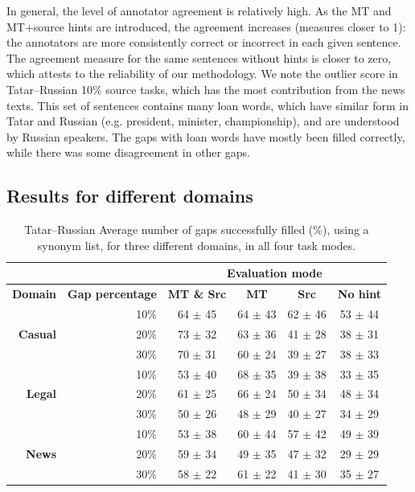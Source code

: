 \documentclass[11pt]{article}
\newcommand{\comment}[1]{}
\begin{document}
In general, the level of annotator agreement is relatively high. As the MT and MT+source hints are introduced, the agreement increases (measures closer to 1): the annotators are more consistently correct or incorrect in each given sentence. The agreement measure for the same sentences without hints is closer to zero, which attests to the reliability of our methodology. We note the outlier score in Tatar--Russian 10\% source tasks, which has the most contribution from the news texts. \comment{EA: this Alpha is from a table we do not report here, I added a couple of words to clarify}This set of sentences contains many loan words, which have similar form in Tatar and Russian (e.g. president, minister, championship), and are understood by Russian speakers. The gaps with loan words have mostly been filled correctly, while there was some disagreement in other gaps.

\subsection{Results for different domains}
\begin{table}
\centering
\begin{tabular}{|r|r |*{4}{c}|}
\hline
\multicolumn{2}{|c|}{} &\multicolumn{4}{c|}{\textbf{Evaluation mode}}\\
\hline
\textbf{Domain} & \textbf{Gap percentage} & \textbf{MT \& Src} & \textbf{MT} & \textbf{Src} & \textbf{No hint} \\
\hline
 \multirow{3}{*}{\textbf{Casual}} &
10\%&64 \(\pm\) 45&64 \(\pm\) 43&62 \(\pm\) 46&53 \(\pm\) 44\\
& 20\%&73 \(\pm\) 32&63 \(\pm\) 36&41 \(\pm\) 28&38 \(\pm\) 31\\
& 30\%&70 \(\pm\) 31&60 \(\pm\) 24&39 \(\pm\) 27&38 \(\pm\) 33\\
\hline
 \multirow{3}{*}{\textbf{Legal}} &
10\%&53 \(\pm\) 40&68 \(\pm\) 35&39 \(\pm\) 38&33 \(\pm\) 35\\
&20\%&61 \(\pm\) 25&66 \(\pm\) 24&50 \(\pm\) 34&48 \(\pm\) 34\\
&30\%&50 \(\pm\) 26&48 \(\pm\) 29&40 \(\pm\) 27&34 \(\pm\) 29\\
\hline
 \multirow{3}{*}{\textbf{News}} &
10\%&53 \(\pm\) 38&60 \(\pm\) 44&57 \(\pm\) 42&49 \(\pm\) 39\\
&20\%&59 \(\pm\) 34&49 \(\pm\) 35&47 \(\pm\) 32&29 \(\pm\) 29\\
&30\%&58 \(\pm\) 22&61 \(\pm\) 22&41 \(\pm\) 30&35 \(\pm\) 27\\
\hline

\end{tabular}
\caption{Tatar--Russian Average number of gaps successfully filled (\%), using a synonym list, for three different domains, in all four task modes.} 
\label{table:rus} 
\end{table}
\end{document}
